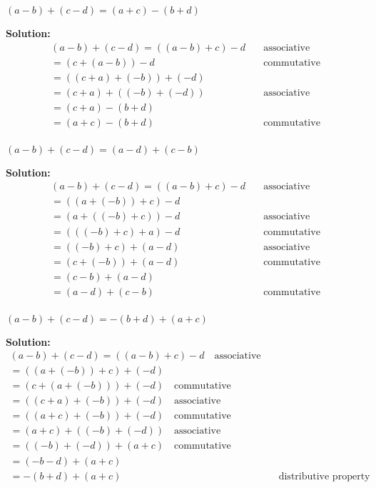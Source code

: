 \documentclass[6pt]{article}
\begin{document}
\begin{tcolorbox}[title=Problem 4, breakable]
$(a - b) + (c - d) = (a + c) - (b + d)$
\end{tcolorbox}

\textbf{Solution:}
\begin{align*}
(a - b) + (c - d) = ((a - b) + c) - d  & \quad \text{associative} \\
=(c + (a - b)) - d  & \quad \text{commutative} \\
=((c + a) + (-b)) + (-d) & \quad \text{} \\
=(c + a) + ((-b) + (-d))  & \quad \text{associative} \\
=(c + a) - (b + d) & \quad \text{} \\
=(a + c) - (b + d) & \quad \text{commutative} \\
\end{align*}

\begin{tcolorbox}[title=Problem 5, breakable]
$(a - b) + (c - d) = (a - d) + (c - b)$
\end{tcolorbox}

\textbf{Solution:}
\begin{align*}
(a - b) + (c - d) = ((a - b) + c) - d & \quad \text{associative} \\
=((a + (-b)) + c) - d  & \quad \text{} \\
=(a + ((-b) + c)) - d & \quad \text{associative} \\
=(((-b) + c) + a) - d & \quad \text{commutative} \\
=((-b) + c) + (a - d) & \quad \text{associative} \\
=(c + (-b)) + (a - d) & \quad \text{commutative} \\
=(c - b) + (a - d) & \quad \text{} \\
=(a - d) + (c - b) & \quad \text{commutative} \\
\end{align*}

\begin{tcolorbox}[title=Problem 6, breakable]
$(a - b) + (c - d) = -(b + d) + (a + c)$
\end{tcolorbox}

\textbf{Solution:}
\begin{align*}
(a - b) + (c - d) = ((a - b) + c) - d \quad \text{associative} \\
=((a + (-b)) + c) + (-d)  & \quad \text{} \\
=(c + (a + (-b))) + (-d) \quad \text{commutative} \\
=((c + a) + (-b)) + (-d) \quad \text{associative} \\
=((a + c) + (-b)) + (-d) \quad \text{commutative} \\
=(a + c) + ((-b) + (-d)) \quad \text{associative} \\
=((-b) + (-d)) + (a + c) \quad \text{commutative} \\
=(-b - d) + (a + c)  & \quad \text{} \\
=-(b + d) + (a + c)  & \quad \text{distributive property} \\
\end{align*}
\end{document}
